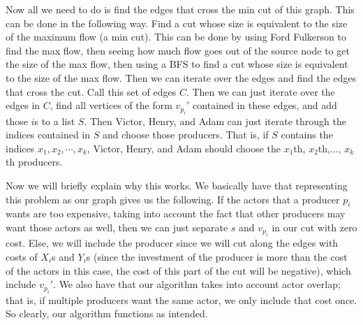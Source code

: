 \documentclass{article}
\begin{document}
Now all we need to do is find the edges that cross the min cut of this graph.
This can be done in the following way. Find a cut whose size is equivalent to
the size of the maximum flow (a min cut). This can be done by using Ford
Fulkerson to find the max flow, then seeing how much flow goes out of the
source node to get the size of the max flow, then using a BFS to find a cut
whose size is equivalent to the size of the max flow. Then we can iterate over the
edges and find the edges that cross the cut. Call this set of edges $C$. Then
we can just iterate over the edges in $C$, find all vertices of the form
$v_{p_i}'$ contained in these edges, and add those $i$s to a list $S$.
Then Victor, Henry, and Adam
can just iterate through the indices contained in $S$ and choose those producers.
That is, if $S$ contains the indices $x_1, x_2, \cdots, x_k$, Victor, Henry, and
Adam should choose the $x_1$th, $x_2$th,..., $x_k$th producers.

Now we will briefly explain why this works. We basically have that representing
this problem as our graph gives us the following. If the actors that a producer
$p_i$ wants are too expensive, taking into account the fact that other producers
may want those actors as well, then we can just separate $s$ and $v_{p_i}$ in
our cut with zero cost. Else, we will include the producer since we will cut
along the edges with costs of $X_i$s and $Y_i$s (since the investment of the
producer is more than the cost of the actors in this case, the cost of this part
of the cut will be negative), which include $v_{p_i}'$.
We also have that our algorithm takes into account actor overlap; that is, if
multiple producers want the same actor, we only include that cost once.
So clearly, our algorithm functions as intended.

\end{document}
